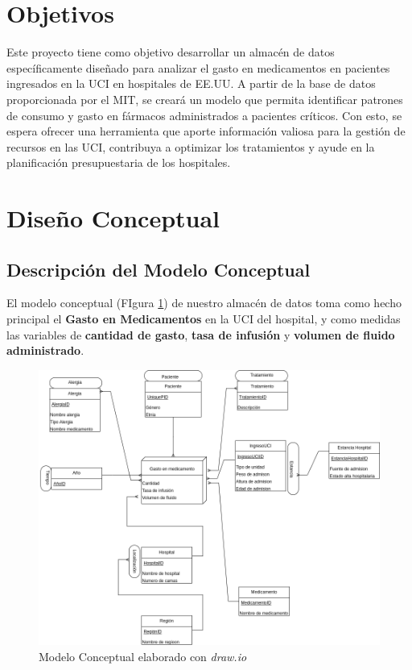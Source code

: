 \documentclass{article}
\begin{document}
\section{Objetivos}
\label{sec:objetivos}

Este proyecto tiene como objetivo desarrollar un almacén de datos específicamente diseñado para analizar el gasto en medicamentos en pacientes ingresados en la UCI en hospitales de EE.UU. A partir de la base de datos proporcionada por el MIT, se creará un modelo que permita identificar patrones de consumo y gasto en fármacos administrados a pacientes críticos. Con esto, se espera ofrecer una herramienta que aporte información valiosa para la gestión de recursos en las UCI, contribuya a optimizar los tratamientos y ayude en la planificación presupuestaria de los hospitales.

\section{Diseño Conceptual}
\label{sec:diseno_conceptual}

\subsection{Descripción del Modelo Conceptual}

El modelo conceptual (FIgura \ref{fig:conceptual}) de nuestro almacén de datos toma como hecho principal el \textbf{Gasto en Medicamentos} en la UCI del hospital, y como medidas las variables de \textbf{cantidad de gasto}, \textbf{tasa de infusión} y \textbf{volumen de fluido administrado}.

\begin{figure}[H]
	\centering
	\includegraphics[width=.7\textwidth]{images/diseño_conceptual.png}
	\caption{Modelo Conceptual elaborado con \textit{draw.io} \cite{drawio}}
	\label{fig:conceptual}
\end{figure}
\end{document}
